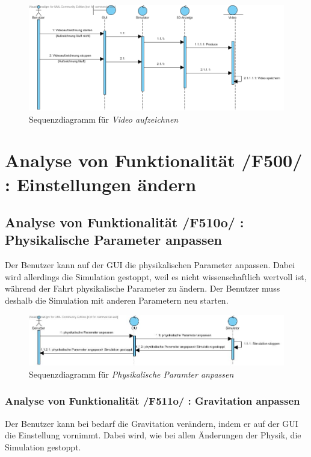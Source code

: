 \begin{figure}[h!]
\includegraphics[width=\linewidth]{bilder/Video_aufzeichnen}
\caption{Sequenzdiagramm für \textit{Video aufzeichnen}}
\end{figure}

\section{Analyse von Funktionalität /F500/ :  Einstellungen ändern}
\subsection{Analyse von Funktionalität /F510o/ :  Physikalische Parameter anpassen}
Der Benutzer kann auf der GUI die physikalischen Parameter anpassen. Dabei wird allerdings die Simulation gestoppt, weil es nicht wissenschaftlich wertvoll ist, während der Fahrt physikalische Parameter zu ändern. Der Benutzer muss deshalb die Simulation mit anderen Parametern neu starten.

\begin{figure}[h!]
\includegraphics[width=\linewidth]{bilder/Physikalische_Parameter_anpassen.jpg}
\caption{Sequenzdiagramm für \textit{Physikalische Paramter anpassen}}
\end{figure}

\subsubsection{Analyse von Funktionalität /F511o/ :  Gravitation anpassen}
Der Benutzer kann bei bedarf die Gravitation verändern, indem er auf der GUI die Einstellung vornimmt. Dabei wird, wie bei allen Änderungen der Physik, die Simulation gestoppt.
